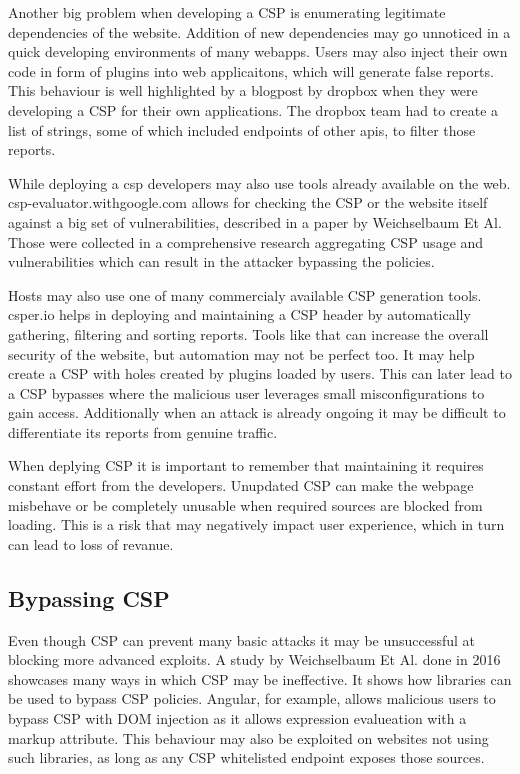 \documentclass[11]{article}   %
\begin{document}
Another big problem when developing a CSP is enumerating legitimate dependencies of the website.
Addition of new dependencies may go unnoticed in a quick developing environments of many webapps.
Users may also inject their own code in form of plugins into web applicaitons, which will generate false reports.
This behaviour is well highlighted by a blogpost by dropbox when they were developing a CSP for their own applications. \cite{dropboxcsp}
The dropbox team had to create a list of strings, some of which included endpoints of other apis, to filter those reports.

While deploying a csp developers may also use tools already available on the web. 
csp-evaluator.withgoogle.com allows for checking the CSP or the website itself against a big set of vulnerabilities, described in a paper by Weichselbaum Et Al. \cite{weichselbaum2016csp}
Those were collected in a comprehensive research aggregating CSP usage and vulnerabilities which can result in the attacker bypassing the policies.

Hosts may also use one of many commercialy available CSP generation tools.
csper.io helps in deploying and maintaining a CSP header by automatically gathering, filtering and sorting reports. 
Tools like that can increase the overall security of the website, but automation may not be perfect too. 
It may help create a CSP with holes created by plugins loaded by users.
This can later lead to a CSP bypasses where the malicious user leverages small misconfigurations to gain access.
Additionally when an attack is already ongoing it may be difficult to differentiate its reports from genuine traffic.

When deplying CSP it is important to remember that maintaining it requires constant effort from the developers.
Unupdated CSP can make the webpage misbehave or be completely unusable when required sources are blocked from loading.
This is a risk that may negatively impact user experience, which in turn can lead to loss of revanue.


\subsection{Bypassing CSP}
Even though CSP can prevent many basic attacks it may be unsuccessful at blocking more advanced exploits.
A study by Weichselbaum Et Al. done in 2016 showcases many ways in which CSP may be ineffective. \cite{weichselbaum2016csp}
It shows how libraries can be used to bypass CSP policies.
Angular, for example, allows malicious users to bypass CSP with DOM injection as it allows expression evalueation with a markup attribute.
This behaviour may also be exploited on websites not using such libraries, as long as any CSP whitelisted endpoint exposes those sources.
\end{document}
